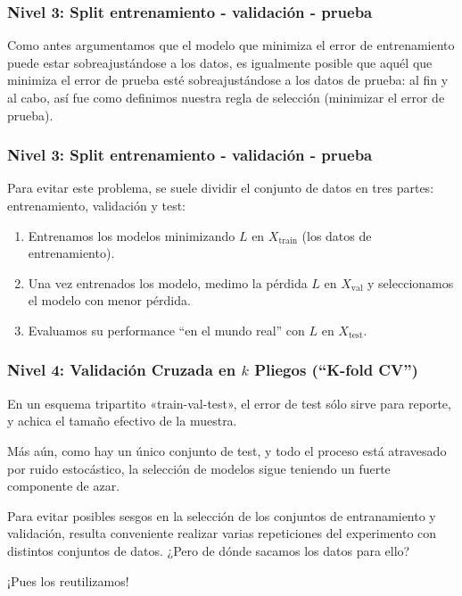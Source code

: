\documentclass[aspectratio=169,12pt]{beamer}
\begin{document}

\begin{frame}
\frametitle{Nivel 3: Split entrenamiento - validación - prueba}

Como antes argumentamos que el modelo que minimiza el error de entrenamiento
puede estar sobreajustándose a los datos, es igualmente posible que aquél que minimiza el error de prueba esté sobreajustándose a los datos de prueba: al fin y al cabo, así fue como definimos nuestra regla de selección (minimizar el error de prueba).
\end{frame}


\begin{frame}
\frametitle{Nivel 3: Split entrenamiento - validación - prueba}

Para evitar este problema, se suele dividir el conjunto de datos en tres partes: entrenamiento, validación y test:
\begin{enumerate}
\item Entrenamos los modelos minimizando $L$ en $X_{\text{train}}$ (los datos de entrenamiento).
\item Una vez entrenados los modelo, medimo la pérdida $L$ en $X_{\text{val}}$ y seleccionamos el modelo con menor pérdida.
\item Evaluamos su performance ``en el mundo real'' con $L$ en $X_{\text{test}}$.
\end{enumerate}

\end{frame}


\begin{frame}
\frametitle{Nivel 4: Validación Cruzada en $k$ Pliegos (``K-fold CV'')}

En un esquema tripartito «train-val-test», el error de test sólo sirve para reporte, y
achica el tamaño efectivo de la muestra. 

Más aún, como hay un único conjunto de
test, y todo el proceso está atravesado por ruido estocástico, la selección de modelos
sigue teniendo un fuerte componente de azar.

Para evitar posibles sesgos en la selección de los conjuntos de entranamiento y validación, resulta conveniente realizar varias repeticiones del experimento con distintos conjuntos de datos. ¿Pero de dónde sacamos los datos para ello?

¡Pues los reutilizamos!

\end{frame}
\end{document}
